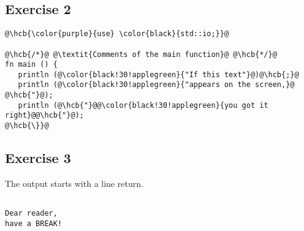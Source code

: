 \subsection*{Exercise 2}

\begin{lstlisting}[style=coloredverbatimCorrect, escapechar=@]
@\hcb{\color{purple}{use} \color{black}{std::io;}}@

@\hcb{/*}@ @\textit{Comments of the main function}@ @\hcb{*/}@
fn main () {
   println (@\color{black!30!applegreen}{"If this text"}@)@\hcb{;}@
   println (@\color{black!30!applegreen}{"appears on the screen,}@ @\hcb{"}@);
   println (@\hcb{"}@@\color{black!30!applegreen}{you got it right}@@\hcb{"}@);
@\hcb{\}}@
\end{lstlisting}

\subsection*{Exercise 3}
The output starts with a line return.
\begin{lstlisting}[style=bashVerb]

Dear reader,
have a BREAK!
\end{lstlisting}
